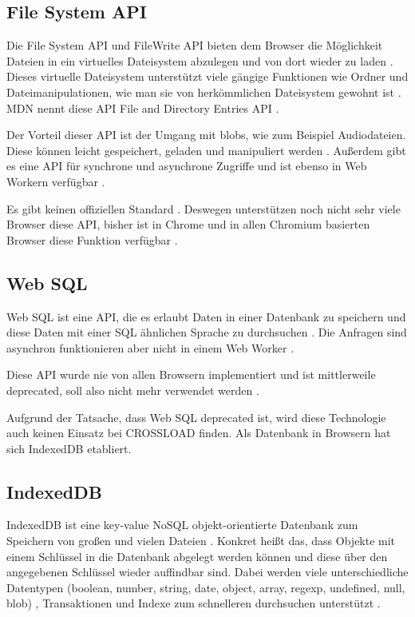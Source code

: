 \subsection{File System API}
Die File System \ac{API} und FileWrite \ac{API} bieten dem Browser die Möglichkeit Dateien in ein virtuelles Dateisystem abzulegen und von dort wieder zu laden \autocite{Hajian2019} \autocite{storage-for-the-web}. Dieses virtuelle Dateisystem unterstützt viele gängige Funktionen wie Ordner und Dateimanipulationen, wie man sie von herkömmlichen Dateisystem gewohnt ist \autocite{mdn-file-system}. \ac{MDN} nennt diese \ac{API} File and Directory Entries \ac{API} \autocite{mdn-file-system}. 

Der Vorteil dieser \ac{API} ist der Umgang mit \acp{blob}, wie zum Beispiel Audiodateien. Diese können leicht gespeichert, geladen und manipuliert werden \autocite{mdn-file-system}. Außerdem gibt es eine \ac{API} für synchrone und asynchrone Zugriffe und ist ebenso in Web Workern verfügbar \autocite{Hajian2019}. 

Es gibt keinen offiziellen Standard \autocite{mdn-file-system} \autocite{caniuse-filesystem}. Deswegen unterstützen noch nicht sehr viele Browser diese \ac{API}, bisher ist in Chrome und in allen Chromium basierten Browser diese Funktion verfügbar \autocite{caniuse-filesystem}.

\subsection{Web SQL}
Web SQL ist eine \ac{API}, die es erlaubt Daten in einer Datenbank zu speichern und diese Daten mit einer SQL ähnlichen Sprache zu durchsuchen \autocite{w3-web-sql}. Die Anfragen sind asynchron funktionieren aber nicht in einem Web Worker \autocite{Hajian2019}.

Diese \ac{API} wurde nie von allen Browsern implementiert und ist mittlerweile deprecated, soll also nicht mehr verwendet werden \autocite{Hajian2019}.

Aufgrund der Tatsache, dass Web SQL deprecated ist, wird diese Technologie auch keinen Einsatz bei CROSSLOAD finden. Als Datenbank in Browsern hat sich IndexedDB etabliert.

\subsection{IndexedDB}
IndexedDB ist eine key-value NoSQL objekt-orientierte Datenbank zum Speichern von großen und vielen Dateien \autocite{Hajian2019}. Konkret heißt das, dass Objekte mit einem Schlüssel in die Datenbank abgelegt werden können und diese über den angegebenen Schlüssel wieder auffindbar sind. Dabei werden viele unterschiedliche Datentypen (boolean, number, string, date, object, array, regexp, undefined, null, \ac{blob}) \autocite{mdn-indexeddb}, Transaktionen und Indexe zum schnelleren durchsuchen unterstützt \autocite{Sheppard2017}. 

